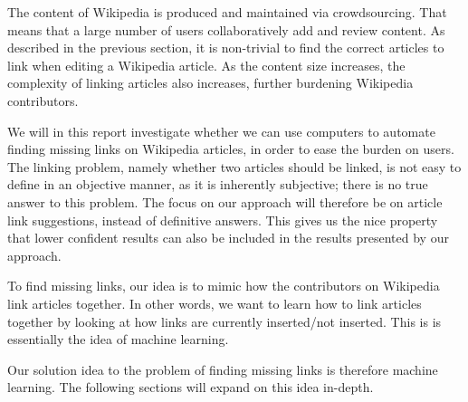 The content of Wikipedia is produced and maintained via crowdsourcing. That means that a large number of users collaboratively add and review content. As described in the previous section, it is non-trivial to find the correct articles to link when editing a Wikipedia article. As the content size increases, the complexity of linking articles also increases, further burdening Wikipedia contributors. 

We will in this report investigate whether we can use computers to automate finding missing links on Wikipedia articles, in order to ease the burden on users. The linking problem, namely whether two articles should be linked, is not easy to define in an objective manner, as it is inherently subjective; there is no true answer to this problem. The focus on our approach will therefore be on article link suggestions, instead of definitive answers. This gives us the nice property that lower confident results can also be included in the results presented by our approach.

To find missing links, our idea is to mimic how the contributors on Wikipedia link articles together. In other words, we want to learn how to link articles together by looking at how links are currently inserted/not inserted. This is is essentially the idea of machine learning. 

Our solution idea to the problem of finding missing links is therefore machine learning. The following sections will expand on this idea in-depth.